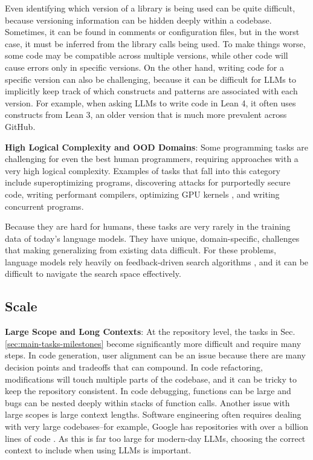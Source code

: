 Even identifying which version of a library is being used can be quite difficult, because versioning information can be hidden deeply within a codebase. Sometimes, it can be found in comments or configuration files, but in the worst case, it must be inferred from the library calls being used. To make things worse, some code may be compatible across multiple versions, while other code will cause errors only in specific versions. On the other hand, writing code for a specific version can also be challenging, because it can be difficult for LLMs to implicitly keep track of which constructs and patterns are associated with each version. For example, when asking LLMs to write code in Lean 4, it often uses constructs from Lean 3, an older version that is much more prevalent across GitHub.

\textbf{High Logical Complexity and OOD Domains}: Some programming tasks are challenging for even the best human programmers, requiring approaches with a very high logical complexity. Examples of tasks that fall into this category include superoptimizing programs, discovering attacks for purportedly secure code, writing performant compilers, optimizing GPU kernels \citep{ouyang2024kernelbench}, and writing concurrent programs.

Because they are hard for humans, these tasks are very rarely in the training data of today's language models. They have unique, domain-specific, challenges that making generalizing from existing data difficult. For these problems, language models rely heavily on feedback-driven search algorithms \citep{mankowitz2023faster}, and it can be difficult to navigate the search space effectively. 

\subsection{Scale}

\textbf{Large Scope and Long Contexts}:
At the repository level, the tasks in Sec. \ref{sec:main-tasks-milestones} become significantly more difficult and require many steps. In code generation, user alignment can be an issue because there are many decision points and tradeoffs that can compound. In code refactoring, modifications will touch multiple parts of the codebase, and it can be tricky to keep the repository consistent. In code debugging, functions can be large and bugs can be nested deeply within stacks of function calls.
Another issue with large scopes is large context lengths. Software engineering often requires dealing with very large codebases--for example, Google has repositories with over a billion lines of code \citep{potvin2016google}. As this is far too large for modern-day LLMs, choosing the correct context to include when using LLMs is important.

